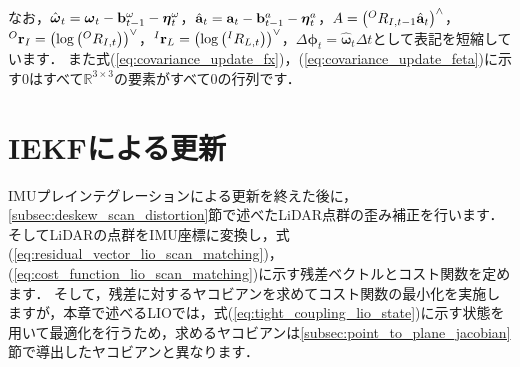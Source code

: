 %
なお，$\hat{ \boldsymbol \omega }_{t} = \boldsymbol \omega_{t} - {\bf b}_{t-1}^{\omega} - \boldsymbol \eta_{t}^{\omega}$，$\hat{ {\bf a} }_{t} = {\bf a}_{t} - {\bf b}_{t-1}^{a} - \boldsymbol \eta_{t}^{a}$，$A = \left( {}^{O}R_{I, t-1} \hat{ {\bf a} }_{t} \right)^{\wedge}$，${}^{O}{\bf r}_{I} = \left( \log \left( {}^{O}R_{I, t} \right) \right)^{\vee}$，${}^{I}{\bf r}_{L} = \left( \log \left( {}^{I}R_{L, t} \right) \right)^{\vee}$，$\Delta \boldsymbol \phi_{t} = \hat{ \boldsymbol \omega }_{t} \Delta t$として表記を短縮しています．
また式(\ref{eq:covariance_update_fx})，(\ref{eq:covariance_update_feta})に示す$0$はすべて$\mathbb{R}^{3 \times 3}$の要素がすべて$0$の行列です．











\section{IEKFによる更新}

IMUプレインテグレーションによる更新を終えた後に，\ref{subsec:deskew_scan_distortion}節で述べたLiDAR点群の歪み補正を行います．
そしてLiDARの点群をIMU座標に変換し，式(\ref{eq:residual_vector_lio_scan_matching})，(\ref{eq:cost_function_lio_scan_matching})に示す残差ベクトルとコスト関数を定めます．
そして，残差に対するヤコビアンを求めてコスト関数の最小化を実施しますが，本章で述べるLIOでは，式(\ref{eq:tight_coupling_lio_state})に示す状態を用いて最適化を行うため，求めるヤコビアンは\ref{subsec:point_to_plane_jacobian}節で導出したヤコビアンと異なります．

